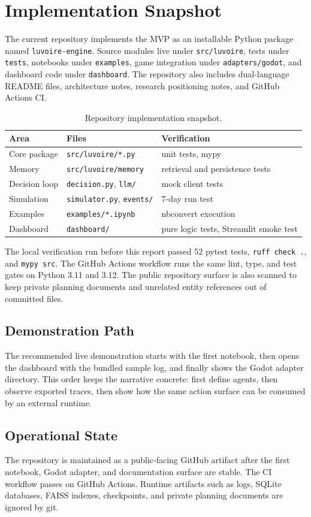 \section{Implementation Snapshot}

The current repository implements the MVP as an installable Python package named \texttt{luvoire-engine}. Source modules live under \texttt{src/luvoire}, tests under \texttt{tests}, notebooks under \texttt{examples}, game integration under \texttt{adapters/godot}, and dashboard code under \texttt{dashboard}. The repository also includes dual-language README files, architecture notes, research positioning notes, and GitHub Actions CI.

\begin{table}[h]
\centering
\begin{tabular}{lll}
\toprule
Area & Files & Verification \\
\midrule
Core package & \texttt{src/luvoire/*.py} & unit tests, mypy \\
Memory & \texttt{src/luvoire/memory} & retrieval and persistence tests \\
Decision loop & \texttt{decision.py}, \texttt{llm/} & mock client tests \\
Simulation & \texttt{simulator.py}, \texttt{events/} & 7-day run test \\
Examples & \texttt{examples/*.ipynb} & nbconvert execution \\
Dashboard & \texttt{dashboard/} & pure logic tests, Streamlit smoke test \\
\bottomrule
\end{tabular}
\caption{Repository implementation snapshot.}
\end{table}

The local verification run before this report passed 52 pytest tests, \texttt{ruff check .}, and \texttt{mypy src}. The GitHub Actions workflow runs the same lint, type, and test gates on Python 3.11 and 3.12. The public repository surface is also scanned to keep private planning documents and unrelated entity references out of committed files.

\subsection{Demonstration Path}

The recommended live demonstration starts with the first notebook, then opens the dashboard with the bundled sample log, and finally shows the Godot adapter directory. This order keeps the narrative concrete: first define agents, then observe exported traces, then show how the same action surface can be consumed by an external runtime.

\subsection{Operational State}

The repository is maintained as a public-facing GitHub artifact after the first notebook, Godot adapter, and documentation surface are stable. The CI workflow passes on GitHub Actions. Runtime artifacts such as logs, SQLite databases, FAISS indexes, checkpoints, and private planning documents are ignored by git.
